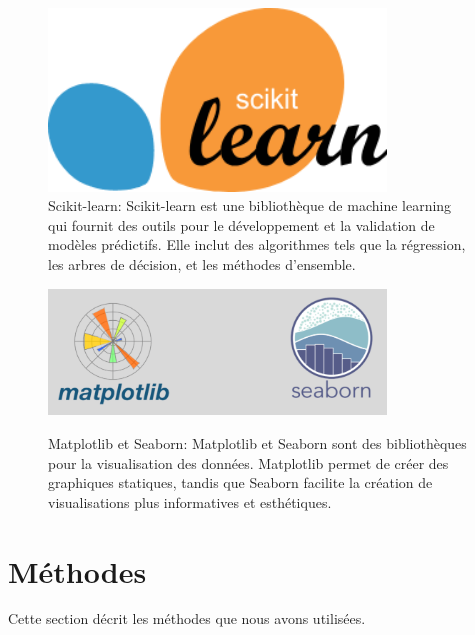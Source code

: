 \begin{figure}[h!]
	\centering
	\begin{minipage}[t]{0.46\textwidth}
		\centering
		\includegraphics[width=0.8\textwidth]{images/logoSckitlearn} \\ %
		\caption[Logo Scikit-learn]{Scikit-learn: Scikit-learn est une bibliothèque de machine learning qui fournit des outils pour le développement et la validation de modèles prédictifs. Elle inclut des algorithmes tels que la régression, les arbres de décision, et les méthodes d'ensemble.}
		\label{fig:sckitlearn}
	\end{minipage}
	\hfill
	\begin{minipage}[t]{0.46\textwidth}
		\centering
		\includegraphics[width=0.8\textwidth]{images/logoMatplotlib&seaborn} \\ %
		\caption[Logo Matplotlib et Seaborn]{Matplotlib et Seaborn: Matplotlib et Seaborn sont des bibliothèques pour la visualisation des données. Matplotlib permet de créer des graphiques statiques, tandis que Seaborn facilite la création de visualisations plus informatives et esthétiques.}
		\label{fig:matplotlib_seaborn}
	\end{minipage}
\end{figure}


\newpage
\section{Méthodes}
Cette section décrit les méthodes que nous avons utilisées.

